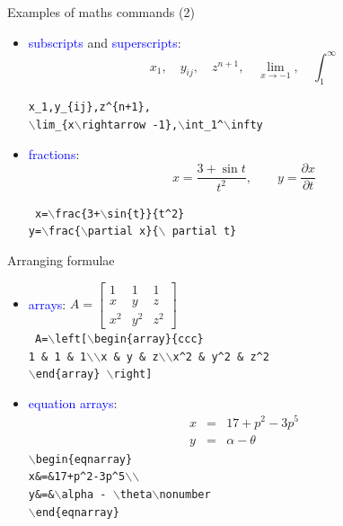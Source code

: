 \documentclass{beamer}
\newcommand{\bc}{\begin{center}}
\newcommand{\ec}{\end{center}}
\newcommand{\bd}{\begin{displaymath}}
\newcommand{\ed}{\end{displaymath}}
\newcommand{\bs}{$\backslash$}
\def\mynormal{\vspace*{-0.5cm}}
\begin{document}
\begin{frame}{Examples of maths commands (2)}
\mynormal
\medskip
\begin{itemize}
\item \textcolor{blue}{subscripts} and \textcolor{blue}{superscripts}:\qquad
\bd
x_1,\quad y_{ij},\quad z^{n+1},\quad\lim_{x\rightarrow -1},\quad \int_1^\infty
\ed
\bc
{\tt x\_1,\quad y\_\{ij\},\quad z\^{}\{n+1\},\\
\quad\bs lim\_\{x\bs rightarrow -1\},\quad \bs int\_1\^{}\bs infty }
\ec
\bigskip
\pause
\item \textcolor{blue}{fractions}:
\bd
x=\frac{3+\sin{t}}{t^2},\qquad y=\frac{\partial x}{\partial t}
\ed
\bc
{\tt
x=\bs frac\{3+\bs sin\{t\}\}\{t\^{}2\}\\ y=\bs frac\{\bs partial x\}\{\bs 
partial t\}}
\ec
\end{itemize}
\end{frame}
\begin{frame}{Arranging formulae}
\mynormal
\medskip
\begin{itemize}
\item \textcolor{blue}{arrays}:\qquad
$A=\left[\begin{array}{ccc}
1 & 1 & 1\\
x & y & z\\
x^2 & y^2 & z^2
\end{array}\right]$\\
\bigskip
{\tt
A=\bs left[\bs begin\{array\}\{ccc\}\\
1 \& 1 \& 1\bs \bs  x \& y \& z\bs \bs x\^{}2 \& y\^{}2 \& z\^{}2\\
 \bs end\{array\} \bs right]
}
\pause
\medskip
\item \textcolor{blue}{equation arrays}:
\vspace{-0.5cm}
\begin{eqnarray}
x&=&17+p^2-3p^5\\
y&=&\alpha -\theta\nonumber
\end{eqnarray}
{\tt \bs begin\{eqnarray\}\\
x\&=\&17+p\^{}2-3p\^{}5\bs \bs \\
y\&=\&\bs alpha - \bs theta\bs nonumber\\
\bs end\{eqnarray\}}
\end{itemize}
\end{frame}
\end{document}

